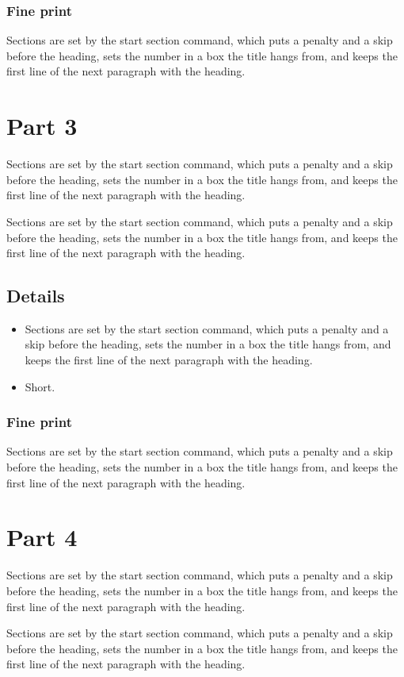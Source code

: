 \documentclass[12pt]{report}
\begin{document}
\subsubsection{Fine print}
Sections are set by the start section command, which puts a penalty and a skip before the heading, sets the number in a box the title hangs from, and keeps the first line of the next paragraph with the heading.

\section{Part 3}
Sections are set by the start section command, which puts a penalty and a skip before the heading, sets the number in a box the title hangs from, and keeps the first line of the next paragraph with the heading.

Sections are set by the start section command, which puts a penalty and a skip before the heading, sets the number in a box the title hangs from, and keeps the first line of the next paragraph with the heading.
\subsection{Details}
\begin{itemize}
\item Sections are set by the start section command, which puts a penalty and a skip before the heading, sets the number in a box the title hangs from, and keeps the first line of the next paragraph with the heading.
\item Short.
\end{itemize}
\subsubsection{Fine print}
Sections are set by the start section command, which puts a penalty and a skip before the heading, sets the number in a box the title hangs from, and keeps the first line of the next paragraph with the heading.

\section{Part 4}
Sections are set by the start section command, which puts a penalty and a skip before the heading, sets the number in a box the title hangs from, and keeps the first line of the next paragraph with the heading.

Sections are set by the start section command, which puts a penalty and a skip before the heading, sets the number in a box the title hangs from, and keeps the first line of the next paragraph with the heading.
\end{document}
